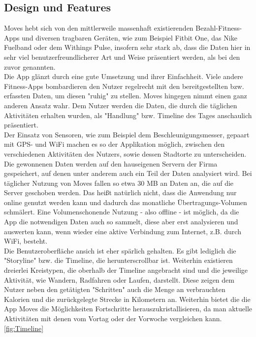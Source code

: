 \subsection{Design und Features}
\label{ch:Apps:sec:Moves:subsec:DuF}

Moves hebt sich von den mittlerweile massenhaft existierenden Bezahl-Fitness-Apps und diversen tragbaren Geräten, wie zum Beispiel Fitbit One, das Nike Fuelband oder dem Withings Pulse, insofern sehr stark ab, dass die Daten hier in sehr viel benutzerfreundlicherer Art und Weise präsentiert werden, als bei den zuvor genannten.
\\
Die App glänzt durch eine gute Umsetzung und ihrer Einfachheit. 
Viele andere Fitness-Apps bombardieren den Nutzer regelrecht mit den bereitgestellten bzw. erfassten Daten, um diesen "ruhig" zu stellen. 
Moves hingegen nimmt einen ganz anderen Ansatz wahr. 
Dem Nutzer werden die Daten, die durch die täglichen Aktivitäten erhalten wurden, als "Handlung" bzw. Timeline des Tages anschaulich präsentiert.
\\
Der Einsatz von Sensoren, wie zum Beispiel dem Beschleunigungsmesser, gepaart mit GPS- und WiFi machen es so der Applikation möglich, zwischen den verschiedenen Aktivitäten des Nutzers, sowie dessen Stadtorte zu unterscheiden. 
Die gewonnenen Daten werden auf den hauseigenen Servern der Firma gespeichert, auf denen unter anderem auch ein Teil der Daten analysiert wird. 
Bei täglicher Nutzung von Moves fallen so etwa 30 MB an Daten an, die auf die Server geschoben werden. 
Das heißt natürlich nicht, dass die Anwendung nur online genutzt werden kann und dadurch das monatliche Übertragungs-Volumen schmälert. 
Eine Volumenschonende Nutzung - also offline - ist möglich, da die App die notwendigen Daten auch so sammelt, diese aber erst analysieren und auswerten kann, wenn wieder eine aktive Verbindung zum Internet, z.B. durch WiFi, besteht.   
\\
Die Benutzeroberfläche ansich ist eher spärlich gehalten. 
Es gibt lediglich die "Storyline" bzw. die Timeline, die herunterscrollbar ist. 
Weiterhin existieren dreierlei Kreistypen, die oberhalb der Timeline angebracht sind und die jeweilige Aktivität, wie Wandern, Radfahren oder Laufen, darstellt. 
Diese zeigen dem Nutzer neben den getätigten "Schritten" auch die Menge an verbrauchten Kalorien und die zurückgelegte Strecke in Kilometern an. 
Weiterhin bietet die die App Moves die Möglichkeiten Fortschritte herauszukristallisieren, da man aktuelle Aktivitäten mit denen vom Vortag oder der Vorwoche vergleichen kann.   
\\
\ref{fig:Timeline}


